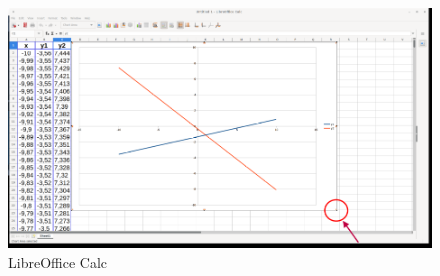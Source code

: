 \begin{figure}[h!]		
	\centering
   	\includegraphics[width=8.0in]{pictures/picture_017.png}
  	\caption{LibreOffice Calc}
   	\label{fig:LibreOfficeCalc017}
\end{figure}